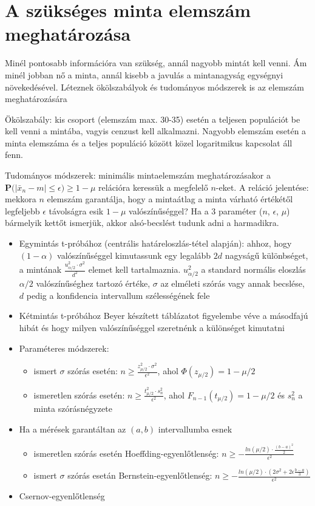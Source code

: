 \section{A szükséges minta elemszám meghatározása}

Minél pontosabb információra van szükség, annál nagyobb mintát kell venni. Ám minél jobban nő a minta, annál kisebb a javulás a mintanagyság egységnyi növekedésével. Léteznek ökölszabályok és tudományos módszerek is az elemszám meghatározására

Ökölszabály: kis csoport (elemszám max. 30-35) esetén a teljesen populációt be kell venni a mintába, vagyis cenzust kell alkalmazni. Nagyobb elemszám esetén a minta elemszáma és a teljes populáció között közel logaritmikus kapcsolat áll fenn.

Tudományos módszerek: minimális mintaelemszám meghatározásakor a \\$\mathbf{P}\big( | \bar{x}_n - m | \leq \epsilon \big)\geq 1-\mu$ relációra keressük a megfelelő $n$-eket. A reláció jelentése: mekkora $n$ elemszám garantálja, hogy a mintaátlag a minta várható értékétől legfeljebb $\epsilon$ távolságra esik $1-\mu$ valószínűséggel? Ha a 3 paraméter ($n$, $\epsilon$, $\mu$) bármelyik kettőt ismerjük, akkor alsó-becslést tudunk adni a harmadikra.
\begin{itemize}
\item Egymintás t-próbához (centrális határeloszlás-tétel alapján): ahhoz, hogy $(1-\alpha)$ valószínűséggel kimutassunk egy legalább $2d$ nagyságű különbséget, a mintának $\frac{u_{\alpha/2}^2 \cdot \sigma^2}{d^2}$ elemet kell tartalmaznia. $u_{\alpha/2}^2$ a standard normális eloszlás $\alpha/2$ valószínűséghez tartozó értéke, $\sigma$ az elméleti szórás vagy annak becslése, $d$ pedig a konfidencia intervallum szélességének fele
\item Kétmintás t-próbához Beyer készített táblázatot figyelembe véve a másodfajú hibát és hogy milyen valószínűséggel szeretnénk a különséget kimutatni
\item Paraméteres módszerek:
	\begin{itemize}
	\item ismert $\sigma$ szórás esetén: $n \geq \frac{z_{\mu/2}^2 \cdot \sigma^2}{\epsilon^2}$, ahol $\Phi(z_{\mu/2}) = 1- \mu/2$
	\item ismeretlen szórás esetén:  $n \geq \frac{t_{\mu/2}^2 \cdot s_n^2}{\epsilon^2}$, ahol $F_{n-1}(t_{\mu/2}) = 1- \mu/2$ és $s_n^2$ a minta szórásnégyzete
	\end{itemize}
\item Ha a mérések garantáltan az $(a,b)$ intervallumba esnek
	\begin{itemize}
	\item ismeretlen szórás esetén Hoeffding-egyenlőtlenség: $n \geq -\frac{ln(\mu/2) \cdot \frac{(b-a)^2}{2}}{\epsilon^2}$
	\item ismert $\sigma$ szórás esetán Bernstein-egyenlőtlenség: $n \geq -\frac{ln(\mu/2) \cdot (2 \sigma^2 + 2\epsilon \frac{b-a}{3})}{\epsilon^2}$
	\end{itemize}
\item Csernov-egyenlőtlenség
\end{itemize}